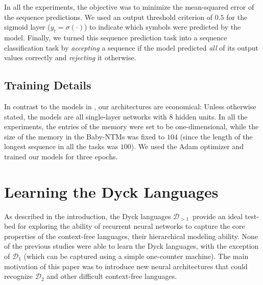 \documentclass[11pt,a4paper]{article}
\theoremstyle{plain}
\newcommand{\dyck}[1]{\ensuremath{\mathcal{D}_{#1}}}
\newcommand{\gendyck}{\dyck{>1}}
\begin{document}
In all the experiments, the objective was to minimize the mean-squared error of the sequence predictions. We used an output threshold criterion of $0.5$ for the sigmoid layer ($y_t = \sigma (\cdot)$) to indicate which symbols were predicted by the model. Finally, we turned this sequence prediction task into a sequence classification task by \textit{accepting} a sequence if the model predicted \emph{all} of its output values correctly and \textit{rejecting} it otherwise. 

\vspace{-0.3em}
 \subsection{Training Details}
 \vspace{-0.3em}
In contrast to the models in \citet{joulin2015inferring, grefenstette2015learning, hao2018context, yu-etal-2019-learning}, our architectures are economical: Unless otherwise stated, the models are all single-layer networks with $8$ hidden units. In all the experiments, the entries of the memory were set to be one-dimensional, while the size of the memory in the Baby-NTMs was fixed to $104$ (since the length of the longest sequence in all the tasks was $100$). We used the Adam optimizer \citep{kingma2014adam}  and trained our models for three epochs. 

\vspace{-0.5em}
\section{Learning the Dyck Languages}
\vspace{-0.2em}
As described in the introduction, the Dyck languages \gendyck\ provide an ideal test-bed for exploring the ability of recurrent neural networks to capture the core properties of the context-free languages, their hierarchical modeling ability. None of the previous studies were able to learn the Dyck languages, with the exception of \dyck{1} (which can be captured using a simple one-counter machine). The main motivation of this paper was to introduce new neural architectures that could recognize \dyck{2} and other difficult context-free languages. 
\end{document}
